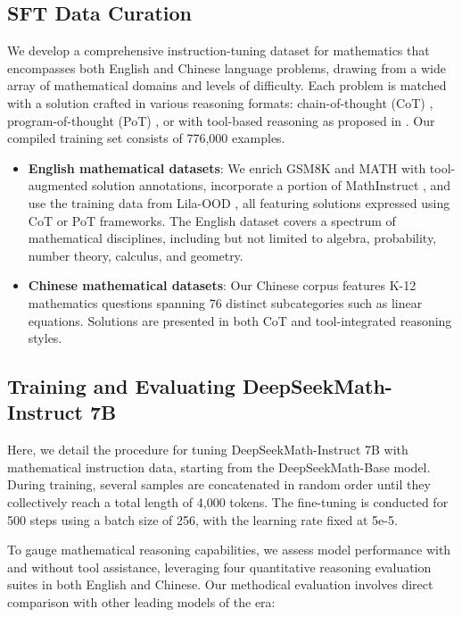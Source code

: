 \begin{itemize}[topsep=0pt]
\subsection{SFT Data Curation}

We develop a comprehensive instruction-tuning dataset for mathematics that encompasses both English and Chinese language problems, drawing from a wide array of mathematical domains and levels of difficulty. Each problem is matched with a solution crafted in various reasoning formats: chain-of-thought (CoT) \citep{cot}, program-of-thought (PoT) \citep{pot,pal}, or with tool-based reasoning as proposed in \citep{tora}. Our compiled training set consists of 776,000 examples.

\begin{itemize}[topsep=0pt]
    \item \textbf{English mathematical datasets}: We enrich GSM8K and MATH with tool-augmented solution annotations, incorporate a portion of MathInstruct \citep{MathInstruct}, and use the training data from Lila-OOD \citep{lila}, all featuring solutions expressed using CoT or PoT frameworks. The English dataset covers a spectrum of mathematical disciplines, including but not limited to algebra, probability, number theory, calculus, and geometry.
    \item \textbf{Chinese mathematical datasets}: Our Chinese corpus features K-12 mathematics questions spanning 76 distinct subcategories such as linear equations. Solutions are presented in both CoT and tool-integrated reasoning styles.
\end{itemize}

\subsection{Training and Evaluating DeepSeekMath-Instruct 7B}

Here, we detail the procedure for tuning DeepSeekMath-Instruct 7B with mathematical instruction data, starting from the DeepSeekMath-Base model. During training, several samples are concatenated in random order until they collectively reach a total length of 4,000 tokens. The fine-tuning is conducted for 500 steps using a batch size of 256, with the learning rate fixed at 5e-5.

To gauge mathematical reasoning capabilities, we assess model performance with and without tool assistance, leveraging four quantitative reasoning evaluation suites in both English and Chinese. Our methodical evaluation involves direct comparison with other leading models of the era:


\end{itemize}
